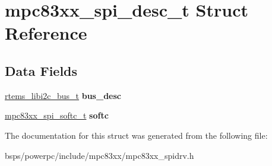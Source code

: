 \hypertarget{structmpc83xx__spi__desc__t}{}\section{mpc83xx\+\_\+spi\+\_\+desc\+\_\+t Struct Reference}
\label{structmpc83xx__spi__desc__t}
\subsection*{Data Fields}
\begin{DoxyCompactItemize}
\item 
\mbox{\label{structmpc83xx__spi__desc__t_a65e41d25f02dade753e0f56d3357f352}} 
\mbox{\hyperlink{structrtems__libi2c__bus__t__}{rtems\+\_\+libi2c\+\_\+bus\+\_\+t}} {\bfseries bus\+\_\+desc}
\item 
\mbox{\label{structmpc83xx__spi__desc__t_ac5c1a8f7b09dec87a5a18d4389ce4da7}} 
\mbox{\hyperlink{structmpc83xx__spi__softc}{mpc83xx\+\_\+spi\+\_\+softc\+\_\+t}} {\bfseries softc}
\end{DoxyCompactItemize}


The documentation for this struct was generated from the following file\+:\begin{DoxyCompactItemize}
\item 
bsps/powerpc/include/mpc83xx/mpc83xx\+\_\+spidrv.\+h\end{DoxyCompactItemize}
